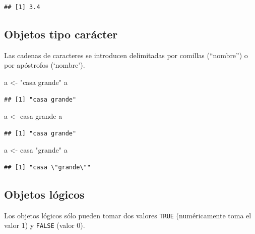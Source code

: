 \documentclass[
]{book}
\newenvironment{Shaded}{\begin{snugshade}}{\end{snugshade}}
\newcommand{\NormalTok}[1]{#1}
\newcommand{\OtherTok}[1]{\textcolor[rgb]{0.56,0.35,0.01}{#1}}
\newcommand{\StringTok}[1]{\textcolor[rgb]{0.31,0.60,0.02}{#1}}
\theoremstyle{break}
\begin{document}
\begin{verbatim}
## [1] 3.4
\end{verbatim}

\hypertarget{objetos-tipo-caruxe1cter}{%
\subsection{Objetos tipo carácter}\label{objetos-tipo-caruxe1cter}}

Las cadenas de caracteres
se introducen delimitadas por comillas (``nombre'') o por apóstrofos
(`nombre').

\begin{Shaded}
\begin{Highlighting}[]
\NormalTok{a }\OtherTok{\textless{}{-}} \StringTok{"casa grande"}
\NormalTok{a}
\end{Highlighting}
\end{Shaded}

\begin{verbatim}
## [1] "casa grande"
\end{verbatim}

\begin{Shaded}
\begin{Highlighting}[]
\NormalTok{a }\OtherTok{\textless{}{-}} \StringTok{\textquotesingle{}casa grande\textquotesingle{}}
\NormalTok{a}
\end{Highlighting}
\end{Shaded}

\begin{verbatim}
## [1] "casa grande"
\end{verbatim}

\begin{Shaded}
\begin{Highlighting}[]
\NormalTok{a }\OtherTok{\textless{}{-}} \StringTok{\textquotesingle{}casa "grande"\textquotesingle{}}
\NormalTok{a}
\end{Highlighting}
\end{Shaded}

\begin{verbatim}
## [1] "casa \"grande\""
\end{verbatim}

\hypertarget{objetos-luxf3gicos}{%
\subsection{Objetos lógicos}\label{objetos-luxf3gicos}}

Los objetos lógicos sólo pueden
tomar dos valores \texttt{TRUE} (numéricamente toma el valor 1) y \texttt{FALSE}
(valor 0).
\end{document}
